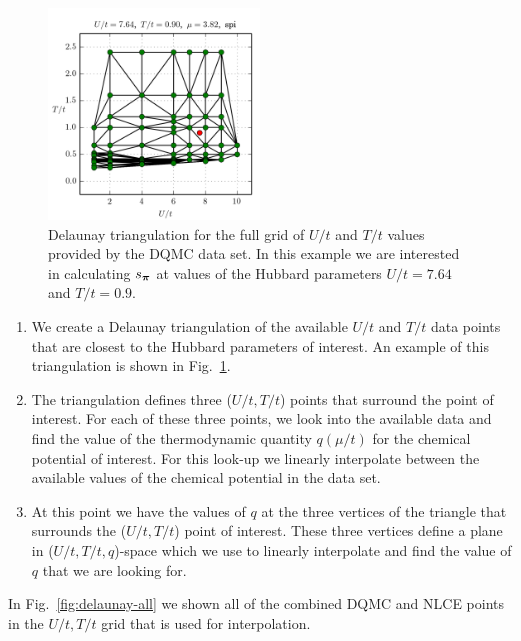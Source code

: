 \begin{figure}
    \centering
\includegraphics[width=0.5\textwidth]{../figures/hubbard-data/dataplots/interp/qmcpts_141013.png}
\caption{Delaunay triangulation for the full grid of $U/t$ and $T/t$ values
provided by the DQMC data set.  In this example we are interested in
calculating $s_{\bm{\pi}}$ at values of the Hubbard parameters $U/t=7.64$ and
$T/t=0.9$. }
\label{fig:delaunay-example}
\end{figure}

\begin{enumerate}

 \item  We create a Delaunay triangulation of the available $U/t$ and $T/t$
data points that are closest to the Hubbard parameters of interest.  An example of this triangulation is shown in Fig.~\ref{fig:delaunay-example}. 

 \item  The triangulation defines three ($U/t,T/t$) points that surround the
point of interest.  For each of these three points, we look into the available
data and find the value of the thermodynamic quantity $q(\mu/t)$ for the
chemical potential of interest.  For this look-up we linearly interpolate
between the available values of the chemical potential in the data set. 

 \item  At this point we have the values of $q$ at the three vertices of the
triangle that surrounds the ($U/t,T/t$) point of interest.  These three
vertices define a plane in  ($U/t,T/t,q$)-space which we use to linearly
interpolate and find the value of $q$ that we are looking for. 
\end{enumerate}

In Fig.~\ref{fig:delaunay-all} we shown all of the combined DQMC and NLCE
points in the $U/t,T/t$ grid that is used for interpolation. 

